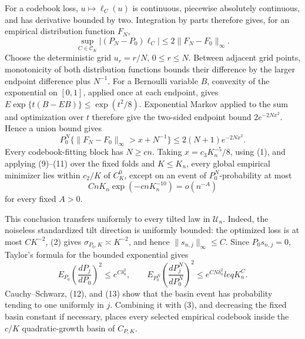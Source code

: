 For a codebook loss, \(u\mapsto\ell_C(u)\) is continuous, piecewise absolutely continuous, and has derivative bounded by two.  Integration by parts therefore gives, for an empirical distribution function \(F_N\),
\[
 \sup_{C\in\mathcal C_K}|(P_N-P_0)\ell_C|
 \leq2\|F_N-F_0\|_\infty.                                                       \tag{10}
\]
Choose the deterministic grid \(u_r=r/N\), \(0\leq r\leq N\).  Between adjacent grid points, monotonicity of both distribution functions bounds their difference by the larger endpoint difference plus \(N^{-1}\).  For a Bernoulli variable \(B\), convexity of the exponential on \([0,1]\), applied once at each endpoint, gives \(E\exp\{t(B-EB)\}\leq\exp(t^2/8)\).  Exponential Markov applied to the sum and optimization over \(t\) therefore give the two-sided endpoint bound \(2e^{-2Nx^2}\).  Hence a union bound gives
\[
 P_0^N\{\|F_N-F_0\|_\infty>x+N^{-1}\}\leq2(N+1)e^{-2Nx^2}.                  \tag{11}
\]
Every codebook-fitting block has \(N\geq c n\).  Taking \(x=c_3K_n^{-5}/8\), using (1), and applying (9)--(11) over the fixed folds and \(K\leq K_n\), every global empirical minimizer lies within \(c_2/K\) of \(C_K^0\), except on an event of \(P_0^N\)-probability at most
\[
 CnK_n\exp(-c nK_n^{-10})=o(n^{-A})                                             \tag{12}
\]
for every fixed \(A>0\).

This conclusion transfers uniformly to every tilted law in \(\mathcal U_n\).  Indeed, the noiseless standardized tilt direction is uniformly bounded: the optimized loss is at most \(CK^{-2}\), (2) gives \(\sigma_{P_0,K}\asymp K^{-2}\), and hence \(\|s_{n,j}\|_\infty\leq C\).  Since \(P_0s_{n,j}=0\), Taylor's formula for the bounded exponential gives
\[
 E_{P_0}\left(\frac{dP_j}{dP_0}\right)^2\leq e^{C\delta_n^2},
 \qquad
 E_{P_0^N}\left(\frac{dP_j^N}{dP_0^N}\right)^2\leq e^{CN\delta_n^2}leq K_n^C. \tag{13}
\]
Cauchy--Schwarz, (12), and (13) show that the basin event has probability tending to one uniformly in \(j\).  Combining it with (3), and decreasing the fixed basin constant if necessary, places every selected empirical codebook inside the \(c/K\) quadratic-growth basin of \(C_{P,K}\).

